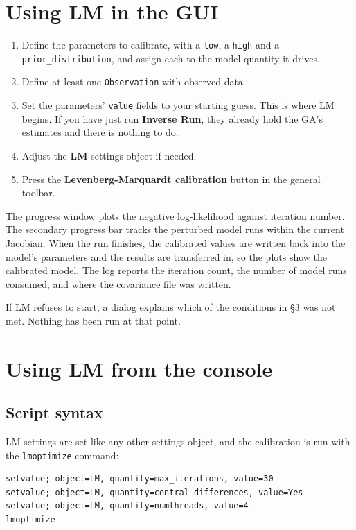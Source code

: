 \documentclass[11pt,a4paper]{article}
\newcommand{\code}[1]{\texttt{\small #1}}
\begin{document}
\section{Using LM in the GUI}

\begin{enumerate}[leftmargin=1.6em]
  \item Define the parameters to calibrate, with a \code{low}, a \code{high} and
        a \code{prior\_distribution}, and assign each to the model quantity it
        drives.
  \item Define at least one \code{Observation} with observed data.
  \item Set the parameters' \code{value} fields to your starting guess. This is
        where LM begins. If you have just run \textbf{Inverse Run}, they already
        hold the GA's estimates and there is nothing to do.
  \item Adjust the \textbf{LM} settings object if needed.
  \item Press the \textbf{Levenberg-Marquardt calibration} button in the general
        toolbar.
\end{enumerate}

The progress window plots the negative log-likelihood against iteration number.
The secondary progress bar tracks the perturbed model runs within the current
Jacobian. When the run finishes, the calibrated values are written back into the
model's parameters and the results are transferred in, so the plots show the
calibrated model. The log reports the iteration count, the number of model runs
consumed, and where the covariance file was written.

If LM refuses to start, a dialog explains which of the conditions in
\S3 was not met. Nothing has been run at that point.

\section{Using LM from the console}\label{sec:console}

\subsection{Script syntax}

LM settings are set like any other settings object, and the calibration is run
with the \code{lmoptimize} command:

\begin{lstlisting}
setvalue; object=LM, quantity=max_iterations, value=30
setvalue; object=LM, quantity=central_differences, value=Yes
setvalue; object=LM, quantity=numthreads, value=4
lmoptimize
\end{lstlisting}
\end{document}
